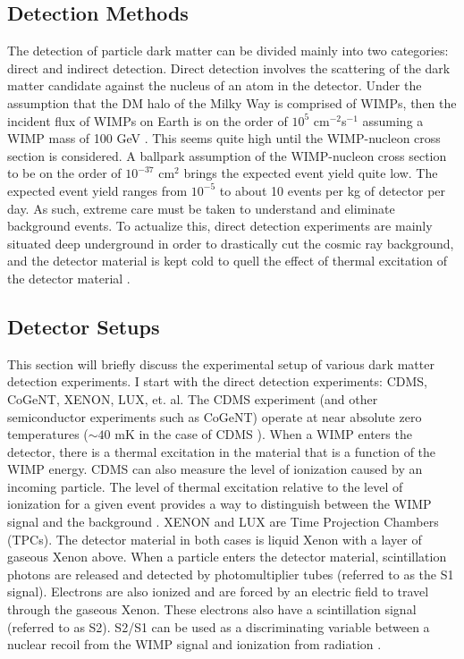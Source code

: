 \documentclass[aps,reprint,prl]{revtex4-1}
\begin{document}
\subsection*{Detection Methods}

The detection of particle dark matter can be divided mainly into two categories: direct and indirect detection.  Direct detection involves the scattering of the dark matter candidate against the nucleus of an atom in the detector.  Under the assumption that the DM halo of the Milky Way is comprised of WIMPs, then the incident flux of WIMPs on Earth is on the order of $10^5$ cm$^{-2}$s$^{-1}$ assuming a WIMP mass of 100 GeV \cite{BertoneBook}.  This seems quite high until the WIMP-nucleon cross section is considered.  A ballpark assumption of the WIMP-nucleon cross section to be on the order of $10^{-37}$ cm$^2$ brings the expected event yield quite low.  The expected event yield ranges from $10^{-5}$ to about 10 events per kg of detector per day.  As such, extreme care must be taken to understand and eliminate background events.  To actualize this, direct detection experiments are mainly situated deep underground in order to drastically cut the cosmic ray background, and the detector material is kept cold to quell the effect of thermal excitation of the detector material \cite{encyclo}.
\subsection*{Detector Setups}
This section will briefly discuss the experimental setup of various dark matter detection experiments.  I start with the direct detection experiments: CDMS, CoGeNT, XENON, LUX, et. al.  The CDMS experiment (and other semiconductor experiments such as CoGeNT) operate at near absolute zero temperatures ($\sim 40$ mK in the case of CDMS \cite{queens}).  When a WIMP enters the detector, there is a thermal excitation in the material that is a function of the WIMP energy.  CDMS can also measure the level of ionization caused by an incoming particle.  The level of thermal excitation relative to the level of ionization for a given event provides a way to distinguish between the WIMP signal and the background \cite{wiki:cdms}.  XENON and LUX are Time Projection Chambers (TPCs).  The detector material in both cases is liquid Xenon with a layer of gaseous Xenon above.  When a particle enters the detector material, scintillation photons are released and detected by photomultiplier tubes (referred to as the S1 signal).  Electrons are also ionized and are forced by an electric field to travel through the gaseous Xenon.  These electrons also have a scintillation signal (referred to as S2).  S2/S1 can be used as a discriminating variable between a nuclear recoil from the WIMP signal and ionization from radiation \cite{BertoneBook,wiki:xenon}.  
\end{document}
